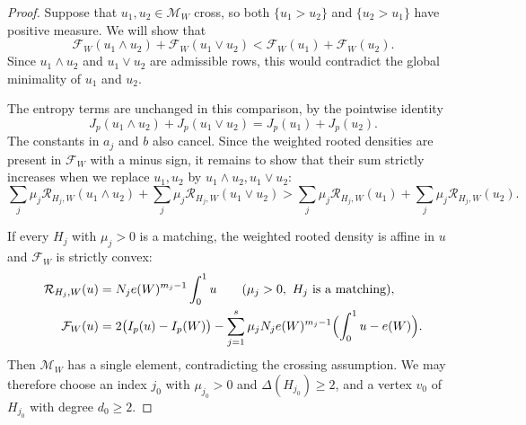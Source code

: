 \begin{proof}
Suppose that $u_1,u_2\in\mathcal M_W$ cross, so both
$\{u_1>u_2\}$ and $\{u_2>u_1\}$ have positive measure.  We will show that
\[
  \mathcal F_W(u_1\wedge u_2)+\mathcal F_W(u_1\vee u_2)
  <\mathcal F_W(u_1)+\mathcal F_W(u_2).
\]
Since $u_1\wedge u_2$ and $u_1\vee u_2$ are admissible rows, this would
contradict the global minimality of $u_1$ and $u_2$.

The entropy terms are unchanged in this comparison, by the pointwise identity
\[
  J_p(u_1\wedge u_2)+J_p(u_1\vee u_2)=J_p(u_1)+J_p(u_2).
\]
The constants in $a_j$ and $b$ also cancel.  Since the weighted rooted
densities are present in $\mathcal F_W$ with a minus sign, it remains to show that
their sum strictly increases when we replace $u_1,u_2$ by
$u_1\wedge u_2,u_1\vee u_2$:
\[
  \sum_j\mu_j\mathcal R_{H_j,W}(u_1\wedge u_2)
  +\sum_j\mu_j\mathcal R_{H_j,W}(u_1\vee u_2)
  >\sum_j\mu_j\mathcal R_{H_j,W}(u_1)+\sum_j\mu_j\mathcal R_{H_j,W}(u_2).
\]

If every $H_j$ with $\mu_j>0$ is a matching, the
weighted rooted density is affine in $u$ and $\mathcal F_W$ is strictly convex:
\begin{align*}
  \mathcal R_{H_j,W}(u)
    &=N_je(W)^{m_j-1}\int_0^1u\qquad(\mu_j>0,\ H_j \text{ is a matching}),\\
  \mathcal F_W(u)
    &=2\bigl(I_p(u)-I_p(W)\bigr)
      -\sum_{j=1}^s\mu_jN_je(W)^{m_j-1}
        \Bigl(\int_0^1u-e(W)\Bigr).
\end{align*}
Then $\mathcal M_W$ has a single element, contradicting the
crossing assumption.  We may therefore choose an index $j_0$ with
$\mu_{j_0}>0$ and $\Delta(H_{j_0})\ge2$, and a vertex $v_0$ of
$H_{j_0}$ with degree $d_0\ge2$.


\end{proof}
